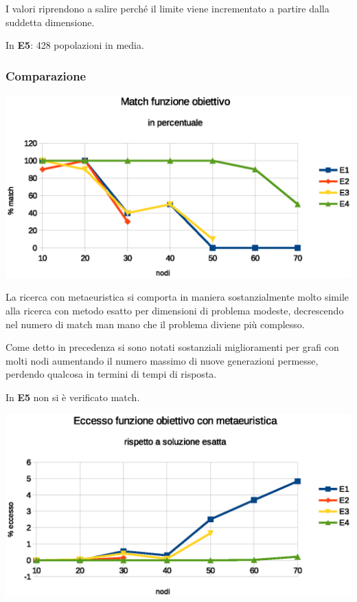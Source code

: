 \documentclass[a4paper]{article}
\begin{document}
                    I valori riprendono a salire perch\'e il limite viene incrementato a partire dalla suddetta dimensione.  

                    In \textbf{E5}: 428 popolazioni in media.

                \subsubsection{Comparazione}

                    \includegraphics[scale=0.7]{img/match}

                    La ricerca con metaeuristica si comporta in maniera sostanzialmente molto simile alla ricerca con metodo esatto per dimensioni di problema modeste,
                    decrescendo nel numero di match man mano che il problema diviene pi\`u complesso.
                    
                    Come detto in precedenza si sono notati sostanziali miglioramenti per grafi con molti nodi aumentando il numero massimo di nuove generazioni permesse, perdendo qualcosa
                    in termini di tempi di risposta.

                    In \textbf{E5} non si \`e verificato match.

                    \includegraphics[scale=0.7]{img/excess}
\end{document}

